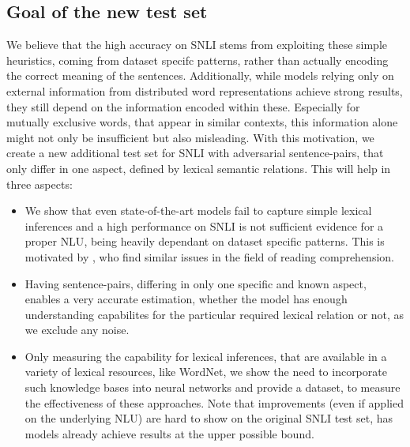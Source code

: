 \subsection{Goal of the new test set}
We believe that the high accuracy on \ac{SNLI} stems from exploiting these simple heuristics, coming from dataset specifc patterns, rather than actually encoding the correct meaning of the sentences. Additionally, while models relying only on external information from distributed word representations achieve strong results, they still depend on the information encoded within these. Especially for mutually exclusive words, that appear in similar contexts, this information alone might not only be insufficient but also misleading. With this motivation, we create a new additional test set \citep{glockner_acl18} for \ac{SNLI} with adversarial sentence-pairs, that only differ in one aspect, defined by lexical semantic relations. This will help in three aspects:
\begin{itemize} 
\item We show that even state-of-the-art models fail to capture simple lexical inferences and a high performance on \ac{SNLI} is not sufficient evidence for a proper \ac{NLU}, being heavily dependant on dataset specific patterns. This is motivated by \cite{jia-liang:2017:EMNLP2017}, who find similar issues in the field of reading comprehension.
\item Having sentence-pairs, differing in only one specific and known aspect, enables a very accurate estimation, whether the model has enough understanding capabilites for the particular required lexical relation or not, as we exclude any noise.
\item Only measuring the capability for lexical inferences, that are available in a variety of lexical resources, like WordNet, we show the need to incorporate such knowledge bases into neural networks and provide a dataset, to measure the effectiveness of these approaches. Note that improvements (even if applied on the underlying \ac{NLU}) are hard to show on the original \ac{SNLI} test set, has models already achieve results at the upper possible bound.
\end{itemize}
